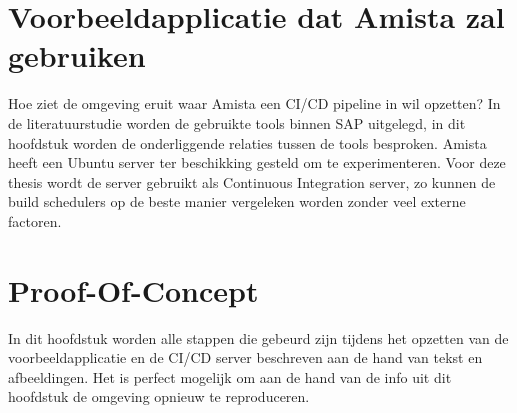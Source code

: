 \section{Voorbeeldapplicatie dat Amista zal gebruiken}
\label{sec:voorbeeldapplicatie}
Hoe ziet de omgeving eruit waar Amista een CI/CD pipeline in wil opzetten? In de literatuurstudie worden de gebruikte tools binnen SAP uitgelegd, in dit hoofdstuk worden de onderliggende relaties tussen de tools besproken.
Amista heeft een Ubuntu server ter beschikking gesteld om te experimenteren. Voor deze thesis wordt de server gebruikt als Continuous Integration server, zo kunnen de build schedulers op de beste manier vergeleken worden zonder veel externe factoren.

\section{Proof-Of-Concept}
\label{sec:proof-of-concept}
In dit hoofdstuk worden alle stappen die gebeurd zijn tijdens het opzetten van de voorbeeldapplicatie en de CI/CD server beschreven aan de hand van tekst en afbeeldingen. Het is perfect mogelijk om aan de hand van de info uit dit hoofdstuk de omgeving opnieuw te reproduceren.
